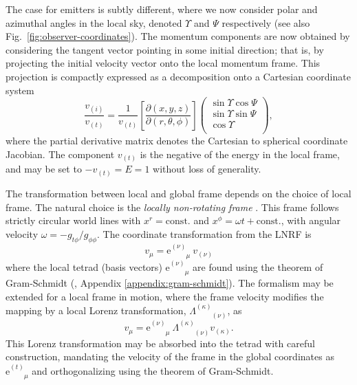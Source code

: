 \documentclass[fleqn,usenatbib]{mnras}
\newcommand{\e}{\text{e}}
\newcommand{\utensor}[3]{#1^{#2}_{\phantom{#2}#3}}
\newcommand{\pderiv}[2]{\frac{\partial #1}{\partial #2}}
\begin{document}
The case for emitters is subtly different, where we now consider polar and
azimuthal angles in the local sky, denoted $\Upsilon$ and $\Psi$ respectively (see
also Fig.~\ref{fig:observer-coordinates}). The momentum components are now
obtained by considering the tangent vector pointing in some initial direction;
that is, by projecting the initial velocity vector onto the local momentum
frame. This projection is compactly expressed as a decomposition onto a
Cartesian coordinate system
\begin{equation}
    \label{eq:local-angle-to-velocity}
    \frac{v_{(i)}}{v_{(t)}} = \frac{1}{v_{(t)}}
    \left[\pderiv{(x, y, z)}{(r, \theta, \phi)}\right]
    \left(
    \begin{matrix}
        \sin \Upsilon \cos \Psi \\
        \sin \Upsilon \sin \Psi \\
        \cos \Upsilon \\
    \end{matrix}
    \right),
\end{equation}
where the partial derivative matrix denotes the Cartesian to spherical
coordinate Jacobian. The component $v_{(t)}$ is the negative of the energy in
the local frame, and may be set to $-v_{(t)}=E=1$ without loss of generality.

The transformation between local and global frame depends on the choice of local
frame. The natural choice is the \emph{locally non-rotating frame}
\citep[LNRF;][]{bardeen_rotating_1972}. This frame follows strictly
circular world lines with $x^r = \text{const.}$ and $x^\phi = \omega t +
\text{const.}$, with angular velocity $\omega = -g_{t\phi} / g_{\phi\phi}$. The
coordinate transformation from the LNRF is
\begin{equation}
    \label{eq:local-to-global-velocity}
    v_\mu = \e^{(\nu)}_{\phantom{(\nu)}\mu}\  v_{(\nu)}
\end{equation}
where the local tetrad (basis vectors) $\e^{(\nu)}_{\phantom{(\nu)}\mu}$ are found
using the theorem of Gram-Schmidt (\citealp{schmidt_uber_1989}, Appendix
\ref{appendix:gram-schmidt}). The formalism may be extended for a local frame
in motion, where the frame velocity modifies the mapping by a local Lorenz
transformation, $\Lambda^{(\kappa)}_{\phantom{(\kappa)}(\nu)}$, as
\begin{equation}
    v_\mu = \e^{(\nu)}_{\phantom{(\nu)}\mu}\  \Lambda^{(\kappa)}_{\phantom{(a)}(\nu)} v_{(\kappa)}.
\end{equation}
This Lorenz transformation may be absorbed into the tetrad with careful
construction, mandating the velocity of the frame in the global coordinates as
$\utensor{\e}{(t)}{\mu}$ and orthogonalizing using the theorem of Gram-Schmidt.
\end{document}
